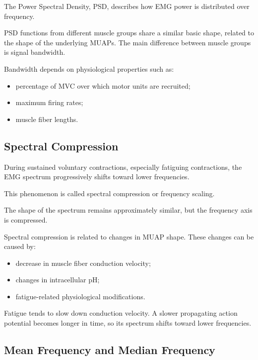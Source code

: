 The Power Spectral Density, PSD, describes how EMG power is distributed over frequency.

PSD functions from different muscle groups share a similar basic shape, related to the shape of the underlying MUAPs. The main difference between muscle groups is signal bandwidth.

Bandwidth depends on physiological properties such as:

\begin{itemize}[noitemsep]
    \item percentage of MVC over which motor units are recruited;
    \item maximum firing rates;
    \item muscle fiber lengths.
\end{itemize}

\subsection{Spectral Compression}

During sustained voluntary contractions, especially fatiguing contractions, the EMG spectrum progressively shifts toward lower frequencies.

This phenomenon is called spectral compression or frequency scaling.

The shape of the spectrum remains approximately similar, but the frequency axis is compressed.

Spectral compression is related to changes in MUAP shape. These changes can be caused by:

\begin{itemize}[noitemsep]
    \item decrease in muscle fiber conduction velocity;
    \item changes in intracellular pH;
    \item fatigue-related physiological modifications.
\end{itemize}

\begin{authornote}
Fatigue tends to slow down conduction velocity. A slower propagating action potential becomes longer in time, so its spectrum shifts toward lower frequencies.
\end{authornote}

\subsection{Mean Frequency and Median Frequency}

